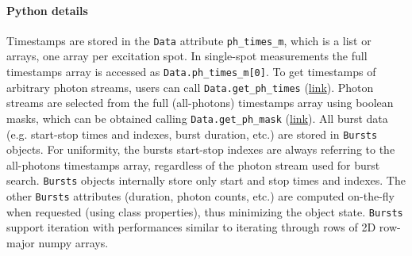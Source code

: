 \paragraph{Python details}
Timestamps are stored in the \verb|Data| attribute \verb|ph_times_m|, which is a list
or arrays, one array per excitation spot. In single-spot measurements the full
timestamps array is accessed as \verb|Data.ph_times_m[0]|. To get  timestamps
of arbitrary photon streams, users can call \verb|Data.get_ph_times|
(\href{http://fretbursts.readthedocs.org/en/latest/data_class.html?highlight=get_ph_times#fretbursts.burstlib.Data.get_ph_times}{link}).
Photon streams are selected from the full (all-photons) timestamps array using
boolean masks, which can be obtained calling \verb|Data.get_ph_mask|
(\href{http://fretbursts.readthedocs.org/en/latest/data_class.html?highlight=get_ph_mask#fretbursts.burstlib.Data.get_ph_mask}{link}).
All burst data (e.g. start-stop times and indexes, burst duration, etc.) are stored in
\verb|Bursts| objects. For uniformity, the bursts start-stop
indexes are always referring to the all-photons timestamps array,
regardless of the photon stream used for burst search.
\verb|Bursts| objects
internally store only start and stop times and indexes.
The other \verb|Bursts| attributes (duration, photon counts, etc.) are computed on-the-fly
when requested (using class properties), thus minimizing the object state.
\verb|Bursts| support iteration
with performances similar to iterating through rows of 2D row-major numpy arrays.
